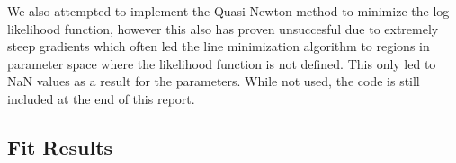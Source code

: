 We also attempted to implement the Quasi-Newton method to minimize the log likelihood function, however this also has proven unsuccesful due to extremely steep gradients which often led the line minimization algorithm to regions in parameter space where the likelihood function is not defined. This only led to NaN values as a result for the parameters. While not used, the code is still included at the end of this report.

\subsection{Fit Results}\label{sec:fitresults}


